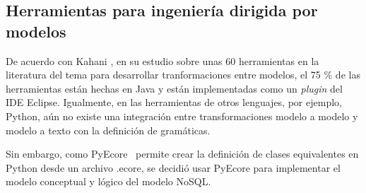 \subsection{Herramientas para ingeniería dirigida por modelos}
De acuerdo con Kahani \cite{kahani_survey_2019}, en su estudio sobre unas 60 herramientas en la literatura del tema para desarrollar tranformaciones entre modelos, el 75 \% de las herramientas están hechas en Java\cite{joy_java_2000} y están implementadas como un \textit{plugin} del IDE Eclipse\cite{eclipse_eclipse_2009}. Igualmente, en las herramientas de otros lenguajes, por ejemplo, Python, aún no existe una integración entre transformaciones modelo a modelo y modelo a texto con la definición de gramáticas. 


Sin embargo, como PyEcore~\cite{pyecore_pyecore_2020} permite crear la definición de clases equivalentes en Python desde un archivo .ecore, se decidió usar PyEcore para implementar el modelo conceptual y lógico del modelo NoSQL.




